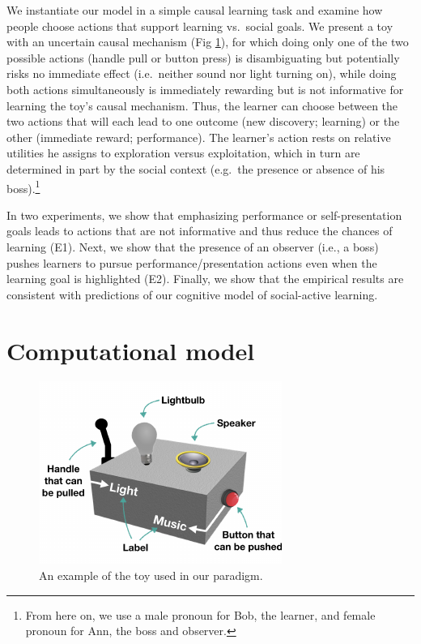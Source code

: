 \documentclass[10pt, letterpaper]{article}
\newenvironment{CodeChunk}{}{}
\begin{document}
We instantiate our model in a simple causal learning task and examine
how people choose actions that support learning vs.~social goals. We
present a toy with an uncertain causal mechanism (Fig \ref{fig:toy}),
for which doing only one of the two possible actions (handle pull or
button press) is disambiguating but potentially risks no immediate
effect (i.e.~neither sound nor light turning on), while doing both
actions simultaneously is immediately rewarding but is not informative
for learning the toy's causal mechanism. Thus, the learner can choose
between the two actions that will each lead to one outcome (new
discovery; learning) or the other (immediate reward; performance). The
learner's action rests on relative utilities he assigns to exploration
versus exploitation, which in turn are determined in part by the social
context (e.g.~the presence or absence of his
boss).\footnote{From here on, we use a male pronoun for Bob, the learner, and female pronoun for Ann, the boss and observer.}

In two experiments, we show that emphasizing performance or
self-presentation goals leads to actions that are not informative and
thus reduce the chances of learning (E1). Next, we show that the
presence of an observer (i.e., a boss) pushes learners to pursue
performance/presentation actions even when the learning goal is
highlighted (E2). Finally, we show that the empirical results are
consistent with predictions of our cognitive model of social-active
learning.

\section{Computational model}\label{computational-model}

\begin{CodeChunk}
\begin{figure}[t]

{\centering \includegraphics[width=0.65\linewidth]{figs/toy-1} 

}

\caption[An example of the toy used in our paradigm]{An example of the toy used in our paradigm.}\label{fig:toy}
\end{figure}
\end{CodeChunk}
\end{document}
